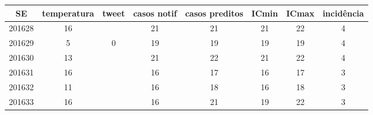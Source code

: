 \begin{tabular}{c|ccccccc}
  \hline
SE & temperatura & tweet & casos notif & casos preditos & ICmin & ICmax & incidência \\ 
  \hline
201628 & 16 &  & 21 & 21 & 21 & 22 & 4 \\ 
  201629 & 5 & 0 & 19 & 19 & 19 & 19 & 4 \\ 
  201630 & 13 &  & 21 & 22 & 21 & 22 & 4 \\ 
  201631 & 16 &  & 16 & 17 & 16 & 17 & 3 \\ 
  201632 & 11 &  & 16 & 18 & 16 & 18 & 3 \\ 
  201633 & 16 &  & 16 & 21 & 19 & 22 & 3 \\ 
   \hline
\end{tabular}
